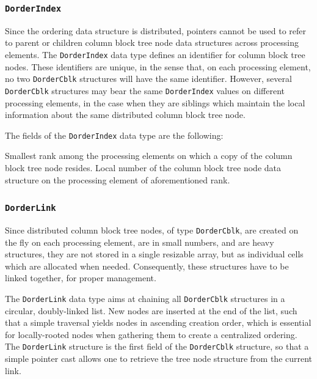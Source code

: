 \subsubsection{\texttt{DorderIndex}}
\label{sec-data-dorder-index}

Since the ordering data structure is distributed, pointers cannot be
used to refer to parent or children column block tree node data
structures across processing elements. The \texttt{Dorder\lbt Index}
data type defines an identifier for column block tree nodes. These
identifiers are unique, in the sense that, on each processing element,
no two \texttt{Dorder\lbt Cblk} structures will have the same
identifier. However, several \texttt{Dorder\lbt Cblk} structures may
bear the same \texttt{Dorder\lbt Index} values on different processing
elements, in the case when they are siblings which maintain the local
information about the same distributed column block tree node.

The fields of the \texttt{DorderIndex} data type are the following:
\begin{itemize}
  Smallest rank among the processing elements on which a copy of the
  column block tree node resides.
  Local number of the column block tree node data structure on the
  processing element of aforementioned rank.
\end{itemize}

\subsubsection{\texttt{DorderLink}}
\label{sec-data-dorder-link}

Since distributed column block tree nodes, of type
\texttt{Dorder\lbt Cblk}, are created on the fly on each processing
element, are in small numbers, and are heavy structures, they are not
stored in a single resizable array, but as individual cells which are
allocated when needed. Consequently, these structures have to be
linked together, for proper management.

The \texttt{DorderLink} data type aims at chaining all
\texttt{Dorder\lbt Cblk} structures in a circular, doubly-linked
list. New nodes are inserted at the end of the list, such that a simple
traversal yields nodes in ascending creation order, which is essential
for locally-rooted nodes when gathering them to create a centralized
ordering. The \texttt{Dorder\lbt Link} structure is the first field of
the \texttt{Dorder\lbt Cblk} structure, so that a simple pointer cast
allows one to retrieve the tree node structure from the current link.


